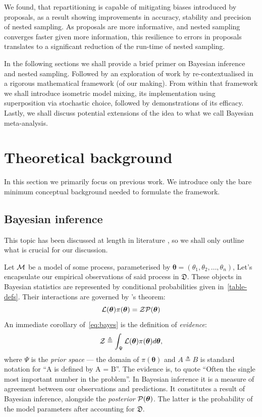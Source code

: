 \documentclass[usenatbib]{mnras}
\begin{document}
We found, that repartitioning is capable of mitigating biases
introduced by proposals, as a result showing improvements in accuracy,
stability and precision of nested sampling. As proposals are more
informative, and nested sampling converges faster given more
information, this resilience to errors in proposals translates to a
significant reduction of the run-time of nested sampling.

In the following sections we shall provide a brief primer on
Bayesian inference and nested sampling. Followed by an exploration of
work by \cite{chen-ferroz-hobson} re-contextualised in a rigorous
mathematical framework (of our making). From within that framework we
shall introduce isometric model mixing, its implementation using
superposition via stochastic choice, followed by demonstrations of its
efficacy. Lastly, we shall discuss potential extensions of the idea to
what we call Bayesian meta-analysis.

\section{Theoretical background}\label{sec:orge6061a4}
In this section we primarily focus on previous work. We introduce only
the bare minimum conceptual background needed to formulate the
framework.

\subsection{Bayesian inference}\label{sec:primer}

This topic has been discussed at length in literature
\citep{jeffreys2010scientific}, so we shall only outline what is
crucial for our discussion.

Let \({\cal M}\) be a model of some process, parameterised by
\(\bm{\theta} = (\theta_{1}, \theta_{2}, \ldots , \theta_{n})\), Let's
encapsulate our empirical observations of said process in
\(\mathfrak{D}\).  These objects in Bayesian statistics are
represented by conditional probabilities given
in~\cref{table-defs}. Their interactions are governed by
\citeauthor{1763}'s theorem:
\begin{equation}\label{eq:bayes} 
 {\cal L}(\bm{\theta})  \pi (\bm{\theta}) = {\cal Z}  {\cal P} (\bm{\theta})
\end{equation}
An immediate corollary of~\cref{eq:bayes} is the definition of \emph{evidence}:
\begin{equation}\label{eq:def-z}
 {\cal Z} \triangleq \int_{\Psi} {\cal L}(\bm{\theta}) \pi(\bm{\theta}) d\bm{\theta}, 
\end{equation}
where \(\Psi\) is the \emph{prior space} --- the domain of
\(\pi(\bm{\theta})\) and \(A \triangleq B\) is standard notation for
``A is defined by A = B''. The evidence is, to quote
\cite{importanceOfZ} ``Often the single most important number in the
problem''. In Bayesian inference it is a measure of agreement between
our observations and predictions. It constitutes a result of Bayesian
inference, alongside the \emph{posterior} \({\cal
  P}(\bm{\theta})\). The latter is the probability of the model
parameters after accounting for \(\mathfrak{D}\). 
\end{document}

